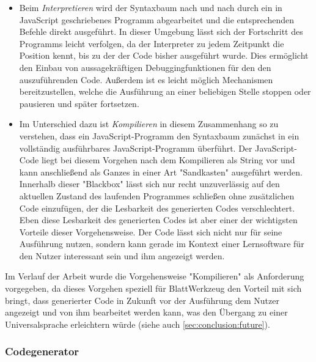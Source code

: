 \begin{itemize}
  \item Beim \emph{Interpretieren} wird der Syntaxbaum nach und nach durch ein in JavaScript geschriebenes Programm abgearbeitet und die entsprechenden Befehle direkt ausgeführt. In dieser Umgebung lässt sich der Fortschritt des Programms leicht verfolgen, da der Interpreter zu jedem Zeitpunkt die Position kennt, bis zu der der Code bisher ausgeführt wurde. Dies ermöglicht den Einbau von aussagekräftigen Debuggingfunktionen für den den auszuführenden Code. Außerdem ist es leicht möglich Mechanismen bereitzustellen, welche die Ausführung an einer beliebigen Stelle stoppen oder pausieren und später fortsetzen.
  \item Im Unterschied dazu ist \emph{Kompilieren} in diesem Zusammenhang so zu verstehen, dass ein JavaScript-Programm den Syntaxbaum zunächst in ein vollständig ausführbares JavaScript-Programm überführt. Der JavaScript-Code liegt bei diesem Vorgehen nach dem Kompilieren als String vor und kann anschließend als Ganzes in einer Art "Sandkasten" ausgeführt werden. Innerhalb dieser "Blackbox" lässt sich nur recht unzuverlässig auf den aktuellen Zustand des laufenden Programmes schließen ohne zusätzlichen Code einzufügen, der die Lesbarkeit des generierten Codes verschlechtert. Eben diese Lesbarkeit des generierten Codes ist aber einer der wichtigsten Vorteile dieser Vorgehensweise. Der Code lässt sich nicht nur für seine Ausführung nutzen, sondern kann gerade im Kontext einer Lernsoftware für den Nutzer interessant sein und ihm angezeigt werden.
\end{itemize}

Im Verlauf der Arbeit wurde die Vorgehensweise "Kompilieren" als Anforderung vorgegeben, da dieses Vorgehen speziell für BlattWerkzeug den Vorteil mit sich bringt, dass generierter Code in Zukunft vor der Ausführung dem Nutzer angezeigt und von ihm bearbeitet werden kann, was den Übergang zu einer Universalsprache erleichtern würde (siehe auch \ref{sec:conclusion:future}).

\subsubsection{Codegenerator}

